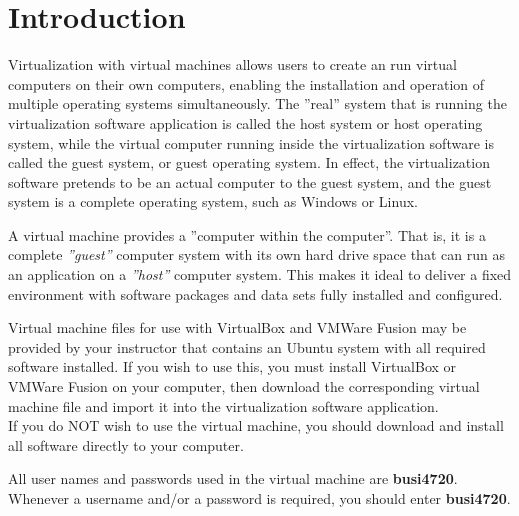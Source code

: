 
\section{Introduction}

Virtualization with virtual machines allows users to create an run virtual computers on their own computers, enabling the installation and operation of multiple operating systems simultaneously. The ''real'' system that is running the virtualization software application is called the host system or host operating system, while the virtual computer running inside the virtualization software is called the guest system, or guest operating system. In effect, the virtualization software pretends to be an actual computer to the guest system, and the guest system is a complete operating system, such as Windows or Linux.

A virtual machine provides a ''computer within the computer''. That is, it is a complete \emph{''guest''} computer system with its own hard drive space that can run as an application on a \emph{''host''} computer system. This makes it ideal to deliver a fixed environment with software packages and data sets fully installed and configured. 

\begin{infobox}
Virtual machine files for use with VirtualBox and VMWare Fusion may be provided by your instructor that contains an Ubuntu system with all required software installed. If you wish to use this, you must install VirtualBox or VMWare Fusion on your computer, then download the corresponding virtual machine file and import it into the virtualization software application.\\

If you do NOT wish to use the virtual machine, you should download and install all software directly to your computer.
\end{infobox}

\begin{infobox}
All user names and passwords used in the virtual machine are \textbf{busi4720}. Whenever a username and/or a password is required, you should enter \textbf{busi4720}.
\end{infobox}
 

